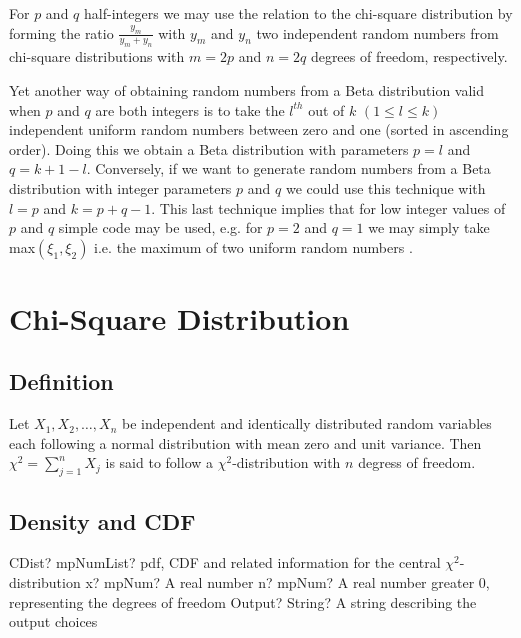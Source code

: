 For $p$ and $q$ half-integers we may use the relation to the chi-square distribution by forming the ratio $\frac{y_m}{y_m + y_n}$ with $y_m$ and $y_n$ two independent random numbers from chi-square distributions with $m =2p$ and $n = 2q$ degrees of freedom, respectively.

Yet another way of obtaining random numbers from a Beta distribution valid when $p$ and $q$ are both integers is to take the $l^{th}$ out of $k$ $(1 \leq l \leq k)$ independent uniform random numbers between zero and one (sorted in ascending order). Doing this we obtain a Beta distribution with parameters $p = l$ and $q = k + 1 - l$. Conversely, if we want to generate random numbers from a Beta distribution with integer parameters $p$ and $q$ we could use this technique with $l = p$ and $k = p+q-1$. This last technique implies that for low integer
values of $p$ and $q$ simple code may be used, e.g. for $p = 2$ and $q = 1$ we may simply take max$(\xi_1, \xi_2)$ i.e. the maximum of two uniform random numbers \citep{walck_2007}.



\newpage
\section{Chi-Square Distribution}
\label{ChiSquareDistribution}

\subsection{Definition}
\label{ChiSquareDistributionDefinition}

Let $X_1, X_2, \ldots, X_n$ be independent and identically distributed random variables each following a normal distribution with mean zero and unit variance. Then $\chi^2 = \sum_{j=1}^n X_j$ is said to follow a $\chi^2$-distribution with $n$ degress of freedom. 


\subsection{Density and CDF}

\begin{mpFunctionsExtract}
	\mpFunctionThreeNotImplemented
	{CDist? mpNumList? pdf, CDF and related information for the central $\chi^2$-distribution}
	{x? mpNum? A real number}
	{n? mpNum? A real number greater 0, representing the degrees of freedom}
	{Output? String? A string describing the output choices}
\end{mpFunctionsExtract}



